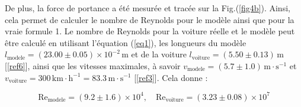 \documentclass[a4paper, 12pt,oneside]{article}
\begin{document}
De plus, la force de portance a été mesurée et tracée sur la Fig.(\ref{fig4b}). Ainsi, cela permet de calculer le nombre de Reynolds pour le modèle ainsi que pour la vraie formule 1. Le nombre de Reynolds pour la voiture réelle et le modèle peut être calculé en utilisant l'équation (\ref{eq1}), les longueurs du modèle \( l_{\text{modele}}=(23.00\pm0.05) \times10^{-2}\,\text{m}\) et de la voiture \( l_{\text{voiture}} = (5.50 \pm 0.13) \, \text{m} \)  [\ref{ref6}], ainsi que les vitesses maximales, à savoir \( v_{\text{modele}} = (5.7 \pm 1.0) \, \text{m} \cdot \text{s}^{-1} \) et \( v_{\text{voiture}} = 300 \, \text{km} \cdot \text{h}^{-1} = 83.3 \, \text{m} \cdot \text{s}^{-1} \) [\ref{ref3}]. Cela donne :

\vspace{0.5cm}

\[
\text{Re}_{\text{modele}} = (9.2 \pm 1.6) \times 10^4, \quad \text{Re}_{\text{voiture}} = (3.23 \pm 0.08) \times 10^7
\] 
\end{document}
